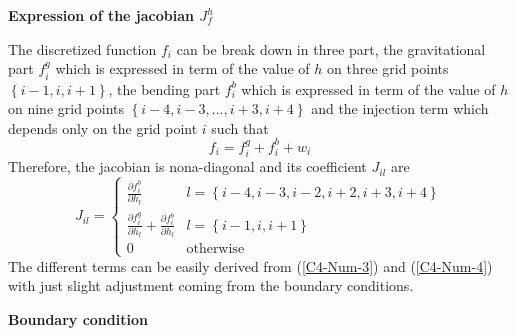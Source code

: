 \vspace{.5cm}    \textbf{Expression   of    the   jacobian    $J_f^h$}
\vspace{.5cm}

The discretized  function $f_i$ can be  break down in three  part, the
gravitational part $f_i^{g}$  which is expressed in term  of the value
of $h$ on three  grid points $\left\{{i-1,i,i+1}\right\}$, the bending
part $f_i^{b}$ which is expressed in term  of the value of $h$ on nine
grid points  $\left\{{i-4,i-3,...,i+3,i+4}\right\}$ and  the injection
term which depends only on the grid point $i$ such that
\begin{equation}
  f_i = f_i^g+f_i^b+w_i
\end{equation}
Therefore, the jacobian is  nona-diagonal and its coefficient $J_{il}$
are
\begin{equation}
  J_{il}=
  \begin{cases}
    \frac{\partial f^{b}_i}{\partial h_{l}} &
    l = \left\{{i-4,i-3,i-2,i+2,i+3,i+4}\right\}\\
    \frac{\partial       f^{g}_i}{\partial       h_{l}}+\frac{\partial
      f^{b}_i}{\partial h_{l}} & l =
    \left\{{i-1,i,i+1}\right\}\\
    0 & \text{otherwise}
  \end{cases}
  \label{C4-C2-eq12}
\end{equation}
The different  terms can be  easily derived from  (\ref{C4-Num-3}) and
(\ref{C4-Num-4}) with just slight  adjustment coming from the boundary
conditions.

\vspace{.5cm} \textbf{Boundary condition} \vspace{.5cm}

